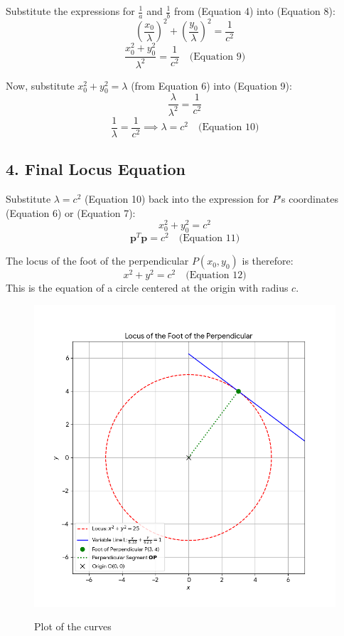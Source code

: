 \documentclass[journal]{IEEEtran}
\begin{document}
Substitute the expressions for $\frac{1}{a}$ and $\frac{1}{b}$ from (Equation 4) into (Equation 8):
$$\left(\frac{x_0}{\lambda}\right)^2 + \left(\frac{y_0}{\lambda}\right)^2 = \frac{1}{c^2}$$
$$\frac{x_0^2 + y_0^2}{\lambda^2} = \frac{1}{c^2} \quad \text{(Equation 9)}$$

Now, substitute $x_0^2 + y_0^2 = \lambda$ (from Equation 6) into (Equation 9):
$$\frac{\lambda}{\lambda^2} = \frac{1}{c^2}$$
$$\frac{1}{\lambda} = \frac{1}{c^2} \implies \lambda = c^2 \quad \text{(Equation 10)}$$



\subsection*{4. Final Locus Equation}

Substitute $\lambda = c^2$ (Equation 10) back into the expression for $P$'s coordinates (Equation 6) or (Equation 7):
$$x_0^2 + y_0^2 = c^2$$
$$\mathbf{p}^T \mathbf{p} = c^2 \quad \text{(Equation 11)}$$

The locus of the foot of the perpendicular $P(x_0, y_0)$ is therefore:
$$x^2 + y^2 = c^2 \quad \text{(Equation 12)}$$
This is the equation of a circle centered at the origin with radius $c$.



\begin{figure}[htbp]
\centering
\includegraphics[width=\columnwidth]{figs/python_plot.png} 
\caption*{Plot of the curves}
\label*{Fig1}
\end{figure}
\end{document}

